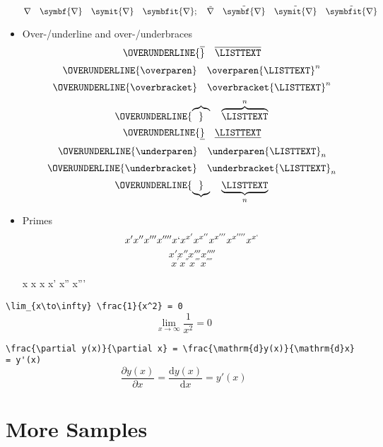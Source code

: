 \documentclass { article }
\begin{document}
\begin{itemize}
        \[
          \nabla                 \quad \symbf{\nabla}           \quad
          \symit{\nabla}         \quad \symbfit{\nabla};        \quad
          \tilde{\nabla}         \quad \tilde{\symbf{\nabla}}   \quad
          \tilde{\symit{\nabla}} \quad \tilde{\symbfit{\nabla}}
        \]
  \item Over-/underline and over-/underbraces
        \[ \OVERUNDERLINE{\overline}     \quad \overline     {\LISTTEXT}   \]
        \[ \OVERUNDERLINE{\overparen}    \quad \overparen    {\LISTTEXT}^n \]
        \[ \OVERUNDERLINE{\overbracket}  \quad \overbracket  {\LISTTEXT}^n \]
        \[ \OVERUNDERLINE{\overbrace}    \quad \overbrace    {\LISTTEXT}^n \]
        \[ \OVERUNDERLINE{\underline}    \quad \underline    {\LISTTEXT}   \]
        \[ \OVERUNDERLINE{\underparen}   \quad \underparen   {\LISTTEXT}_n \]
        \[ \OVERUNDERLINE{\underbracket} \quad \underbracket {\LISTTEXT}_n \]
        \[ \OVERUNDERLINE{\underbrace}   \quad \underbrace   {\LISTTEXT}_n \]
  \item Primes
        \[ x' x'' x''' x'''' x` x^{x'} x^{x''} x^{x'''} x^{x''''} x^{x`} \]
        \[ x \prime x \dprime x \trprime x \qprime \]
        \[ x^{\prime} x^{\dprime} x^{\trprime} x^{\qprime} \] %
        \begin{center}
          \firatext x x x x' x'' x'''
        \end{center}
\end{itemize}

\verb|\lim_{x\to\infty} \frac{1}{x^2} = 0|
\[ \lim_{x\to\infty} \frac{1}{x^2} = 0 \]

\verb|\frac{\partial y(x)}{\partial x} = \frac{\mathrm{d}y(x)}{\mathrm{d}x} = y'(x)|
\[ \frac{\partial y(x)}{\partial x} = \frac{\mathrm{d}y(x)}{\mathrm{d}x} = y'(x) \]

\section{More Samples}

\def\ee{\mathrm{e}}
\def\ii{\mathrm{i}}
\def\bm{\symbf}
\newcommand{\innerprod}[2]{\left\langle{#1}\middle\vert{#2}\right\rangle}
\newcommand{\brakket}[3]{\left\langle{#1}\middle\vert{#2}\middle\vert{#3}\right\rangle}
\end{document}
